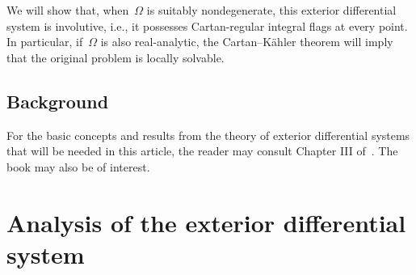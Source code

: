 We will show that, when~$\Omega$ is suitably nondegenerate,
this exterior differential system is involutive, i.e.,
it possesses Cartan-regular integral flags at every point.
In particular, if~$\Omega$ is also real-analytic,
the Cartan--K\"ahler theorem will imply that the original problem
is locally solvable.

\subsection{Background}
For the basic concepts and results
from the theory of exterior differential systems
that will be needed in this article,
the reader may consult Chapter III of~\cite{BCGGG}. The book \cite{CFB} may also be of interest.

\section{Analysis of the exterior differential system}\label{EDS-sec}

